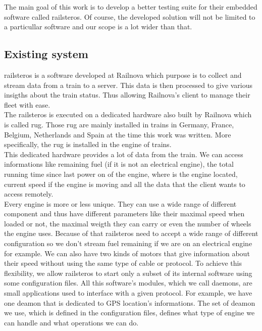 \documentclass[12pt]{article}
\begin{document}
The main goal of this work is to develop a better testing suite for their embedded software called \gls{railsteros}. Of course, the developed solution will not be limited to a particullar software and our scope is a lot wider than that.\\

\subsection{Existing system}

\gls{railsteros} is a software developed at Railnova which purpose is to collect and stream data from a train to a server. This data is then processed to give various insigths about the train status. Thus allowing Railnova's client to manage their fleet with ease.\\

The \gls{railsteros} is executed on a dedicated hardware also built by Railnova which is called \gls{rug}. Those \gls{rug} are mainly installed in trains in Germany, France, Belgium, Netherlands and Spain at the time this work was written. More specifically, the \gls{rug} is installed in the engine of trains.\\

This dedicated hardware provides a lot of data from the train. We can access informations like remaining fuel (if it is not an electrical engine), the total running time since last power on of the engine, where is the engine located, current speed if the engine is moving and all the data that the client wants to access remotely.\\

Every engine is more or less unique. They can use a wide range of different component and thus have different parameters like their maximal speed when loaded or not, the maximal weigth they can carry or even the number of wheels the engine uses. Because of that \gls{railsteros} need to accept a wide range of different configuration so we don't stream fuel remaining if we are on an electrical engine for example. We can also have two kinds of motors that give information about their speed without using the same type of cable or protocol. To achieve this flexibility, we allow \gls{railsteros} to start only a subset of its internal software using some configuration files. All this software's modules, which we call \gls{daemons}, are small applications used to interface with a given protocol. For example, we have one deamon that is dedicated to GPS location's informations. The set of deamon we use, which is defined in the configuration files, defines what type of engine we can handle and what operations we can do.\\
\end{document}
